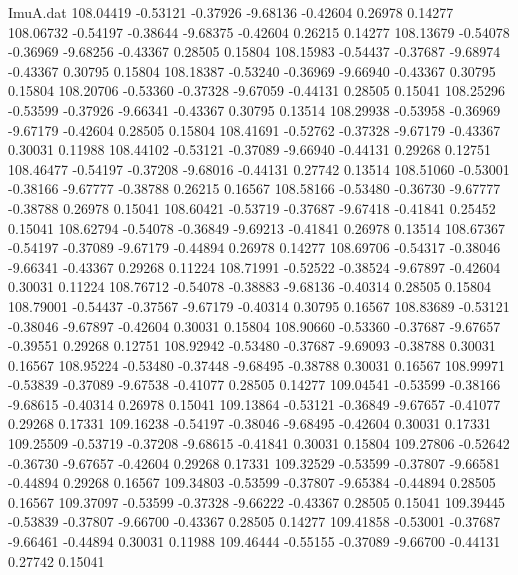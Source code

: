\begin{filecontents}{ImuA.dat}
 108.04419   -0.53121   -0.37926   -9.68136   -0.42604    0.26978    0.14277
 108.06732   -0.54197   -0.38644   -9.68375   -0.42604    0.26215    0.14277
 108.13679   -0.54078   -0.36969   -9.68256   -0.43367    0.28505    0.15804
 108.15983   -0.54437   -0.37687   -9.68974   -0.43367    0.30795    0.15804
 108.18387   -0.53240   -0.36969   -9.66940   -0.43367    0.30795    0.15804
 108.20706   -0.53360   -0.37328   -9.67059   -0.44131    0.28505    0.15041
 108.25296   -0.53599   -0.37926   -9.66341   -0.43367    0.30795    0.13514
 108.29938   -0.53958   -0.36969   -9.67179   -0.42604    0.28505    0.15804
 108.41691   -0.52762   -0.37328   -9.67179   -0.43367    0.30031    0.11988
 108.44102   -0.53121   -0.37089   -9.66940   -0.44131    0.29268    0.12751
 108.46477   -0.54197   -0.37208   -9.68016   -0.44131    0.27742    0.13514
 108.51060   -0.53001   -0.38166   -9.67777   -0.38788    0.26215    0.16567
 108.58166   -0.53480   -0.36730   -9.67777   -0.38788    0.26978    0.15041
 108.60421   -0.53719   -0.37687   -9.67418   -0.41841    0.25452    0.15041
 108.62794   -0.54078   -0.36849   -9.69213   -0.41841    0.26978    0.13514
 108.67367   -0.54197   -0.37089   -9.67179   -0.44894    0.26978    0.14277
 108.69706   -0.54317   -0.38046   -9.66341   -0.43367    0.29268    0.11224
 108.71991   -0.52522   -0.38524   -9.67897   -0.42604    0.30031    0.11224
 108.76712   -0.54078   -0.38883   -9.68136   -0.40314    0.28505    0.15804
 108.79001   -0.54437   -0.37567   -9.67179   -0.40314    0.30795    0.16567
 108.83689   -0.53121   -0.38046   -9.67897   -0.42604    0.30031    0.15804
 108.90660   -0.53360   -0.37687   -9.67657   -0.39551    0.29268    0.12751
 108.92942   -0.53480   -0.37687   -9.69093   -0.38788    0.30031    0.16567
 108.95224   -0.53480   -0.37448   -9.68495   -0.38788    0.30031    0.16567
 108.99971   -0.53839   -0.37089   -9.67538   -0.41077    0.28505    0.14277
 109.04541   -0.53599   -0.38166   -9.68615   -0.40314    0.26978    0.15041
 109.13864   -0.53121   -0.36849   -9.67657   -0.41077    0.29268    0.17331
 109.16238   -0.54197   -0.38046   -9.68495   -0.42604    0.30031    0.17331
 109.25509   -0.53719   -0.37208   -9.68615   -0.41841    0.30031    0.15804
 109.27806   -0.52642   -0.36730   -9.67657   -0.42604    0.29268    0.17331
 109.32529   -0.53599   -0.37807   -9.66581   -0.44894    0.29268    0.16567
 109.34803   -0.53599   -0.37807   -9.65384   -0.44894    0.28505    0.16567
 109.37097   -0.53599   -0.37328   -9.66222   -0.43367    0.28505    0.15041
 109.39445   -0.53839   -0.37807   -9.66700   -0.43367    0.28505    0.14277
 109.41858   -0.53001   -0.37687   -9.66461   -0.44894    0.30031    0.11988
 109.46444   -0.55155   -0.37089   -9.66700   -0.44131    0.27742    0.15041
\end{filecontents}
